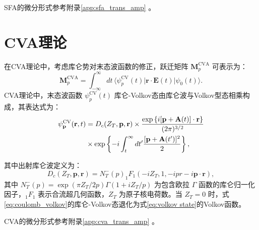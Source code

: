 SFA的微分形式参考附录\ref{app:sfa_trans_amp} 。

\section{CVA理论}
在CVA理论中，考虑库仑势对末态波函数的修正，跃迁矩阵 $\mathbf{M}_p^{\text{CVA}}$ 可表示为：  
\begin{equation}  
\mathbf{M}_p^{\text{CVA}} = \int_{-\infty}^{\infty} dt \, \langle \psi_p^{\text{CV}}(t) | \mathbf{r} \cdot \mathbf{E}(t) | \psi_0(t) \rangle. \label{eq:primal M_p_cva}  
\end{equation}  
CVA理论中，末态波函数 $\psi_p^{\text{CV}}(t)$ 库仑-Volkov态由库仑波与Volkov型态相乘构成，其表达式为：  
\begin{equation}  
\begin{split}
\psi_{\mathbf{p}}^{\rm CV}(\mathbf{r},t) 
& = D_c(Z_T, \mathbf{p}, \mathbf{r}) \times \frac{\exp\left\{i[\mathbf{p} + \mathbf{A}(t)] \cdot \mathbf{r}\right\}}{(2\pi)^{3/2}} \\
& \times \exp\left\{-i \int_t^\infty dt' \frac{[\mathbf{p} + \mathbf{A}(t')]^2}{2}\right\}, \label{eq:coulomb_volkov}  
\end{split}
\end{equation}  

其中出射库仑波定义为：  
\begin{equation}  
D_c(Z_T, \mathbf{p}, \mathbf{r}) = N_T^-(p)_1 F_1(-iZ_T, 1, -ipr - i\mathbf{p} \cdot \mathbf{r}), \label{eq:outgoing wave}
\end{equation}  
其中 $N_T^-(p) = \exp(\pi Z_T/2p)\Gamma(1+iZ_T/p)$ 为包含欧拉 $\Gamma$ 函数的库仑归一化因子，$_1F_1$ 表示合流超几何函数，$Z_T$ 为原子核电荷数。当 $Z_T=0$ 时，式\eqref{eq:coulomb_volkov}的库仑-Volkov态退化为式\eqref{eq:volkov state}的Volkov函数。

CVA的微分形式参考附录\ref{app:cva_trans_amp} 。